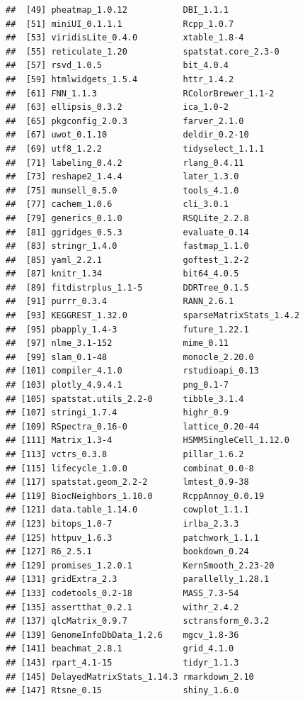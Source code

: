 \documentclass[
]{book}
\begin{document}
\begin{verbatim}
##  [49] pheatmap_1.0.12           DBI_1.1.1                
##  [51] miniUI_0.1.1.1            Rcpp_1.0.7               
##  [53] viridisLite_0.4.0         xtable_1.8-4             
##  [55] reticulate_1.20           spatstat.core_2.3-0      
##  [57] rsvd_1.0.5                bit_4.0.4                
##  [59] htmlwidgets_1.5.4         httr_1.4.2               
##  [61] FNN_1.1.3                 RColorBrewer_1.1-2       
##  [63] ellipsis_0.3.2            ica_1.0-2                
##  [65] pkgconfig_2.0.3           farver_2.1.0             
##  [67] uwot_0.1.10               deldir_0.2-10            
##  [69] utf8_1.2.2                tidyselect_1.1.1         
##  [71] labeling_0.4.2            rlang_0.4.11             
##  [73] reshape2_1.4.4            later_1.3.0              
##  [75] munsell_0.5.0             tools_4.1.0              
##  [77] cachem_1.0.6              cli_3.0.1                
##  [79] generics_0.1.0            RSQLite_2.2.8            
##  [81] ggridges_0.5.3            evaluate_0.14            
##  [83] stringr_1.4.0             fastmap_1.1.0            
##  [85] yaml_2.2.1                goftest_1.2-2            
##  [87] knitr_1.34                bit64_4.0.5              
##  [89] fitdistrplus_1.1-5        DDRTree_0.1.5            
##  [91] purrr_0.3.4               RANN_2.6.1               
##  [93] KEGGREST_1.32.0           sparseMatrixStats_1.4.2  
##  [95] pbapply_1.4-3             future_1.22.1            
##  [97] nlme_3.1-152              mime_0.11                
##  [99] slam_0.1-48               monocle_2.20.0           
## [101] compiler_4.1.0            rstudioapi_0.13          
## [103] plotly_4.9.4.1            png_0.1-7                
## [105] spatstat.utils_2.2-0      tibble_3.1.4             
## [107] stringi_1.7.4             highr_0.9                
## [109] RSpectra_0.16-0           lattice_0.20-44          
## [111] Matrix_1.3-4              HSMMSingleCell_1.12.0    
## [113] vctrs_0.3.8               pillar_1.6.2             
## [115] lifecycle_1.0.0           combinat_0.0-8           
## [117] spatstat.geom_2.2-2       lmtest_0.9-38            
## [119] BiocNeighbors_1.10.0      RcppAnnoy_0.0.19         
## [121] data.table_1.14.0         cowplot_1.1.1            
## [123] bitops_1.0-7              irlba_2.3.3              
## [125] httpuv_1.6.3              patchwork_1.1.1          
## [127] R6_2.5.1                  bookdown_0.24            
## [129] promises_1.2.0.1          KernSmooth_2.23-20       
## [131] gridExtra_2.3             parallelly_1.28.1        
## [133] codetools_0.2-18          MASS_7.3-54              
## [135] assertthat_0.2.1          withr_2.4.2              
## [137] qlcMatrix_0.9.7           sctransform_0.3.2        
## [139] GenomeInfoDbData_1.2.6    mgcv_1.8-36              
## [141] beachmat_2.8.1            grid_4.1.0               
## [143] rpart_4.1-15              tidyr_1.1.3              
## [145] DelayedMatrixStats_1.14.3 rmarkdown_2.10           
## [147] Rtsne_0.15                shiny_1.6.0
\end{verbatim}

  
\end{document}
